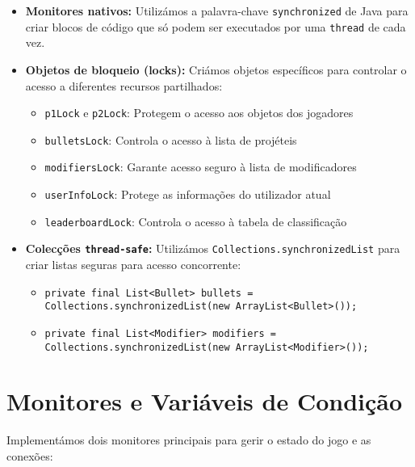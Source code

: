\documentclass[12pt,a4paper]{report}
\begin{document}
\begin{itemize}
    \item \textbf{Monitores nativos:} Utilizámos a palavra-chave \texttt{synchronized} de Java para criar blocos de código que só podem ser executados por uma \texttt{thread} de cada vez.
    
    \item \textbf{Objetos de bloqueio (locks):} Criámos objetos específicos para controlar o acesso a diferentes recursos partilhados:
    \begin{itemize}
        \item \texttt{p1Lock} e \texttt{p2Lock}: Protegem o acesso aos objetos dos jogadores
        \item \texttt{bulletsLock}: Controla o acesso à lista de projéteis
        \item \texttt{modifiersLock}: Garante acesso seguro à lista de modificadores
        \item \texttt{userInfoLock}: Protege as informações do utilizador atual
        \item \texttt{leaderboardLock}: Controla o acesso à tabela de classificação
    \end{itemize}
    
    \item \textbf{Colecções \texttt{thread-safe}:} Utilizámos \texttt{Collections.synchronizedList} para criar listas seguras para acesso concorrente:
    \begin{itemize}
        \item \texttt{private final List<Bullet> bullets = Collections.synchronizedList(new ArrayList<Bullet>());}
        \item \texttt{private final List<Modifier> modifiers = Collections.synchronizedList(new ArrayList<Modifier>());}
    \end{itemize}
\end{itemize}

\section{Monitores e Variáveis de Condição}

Implementámos dois monitores principais para gerir o estado do jogo e as conexões:
\end{document}
